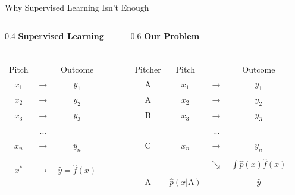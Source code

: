 \documentclass{beamer}
\begin{document}
  \begin{frame}{Why Supervised Learning Isn't Enough}
    \begin{columns}
      \begin{column}{0.4\columnwidth}
        \centering
        {\bf Supervised Learning}\\
        ~\\
        \begin{tabular}{ccc}
          Pitch &               & Outcome\\
          $x_1$ & $\rightarrow$ & $y_1$\\
          $x_2$ & $\rightarrow$ & $y_2$\\
          $x_3$ & $\rightarrow$ & $y_3$\\
                & ...           &      \\
          $x_n$ & $\rightarrow$ & $y_n$\\
          \\
          \\
          \\
          $x^*$ & $\rightarrow$ & $\hat y = \hat f(x)$\\
        \end{tabular}
      \end{column}
      \begin{column}{0.6\columnwidth}
        \centering
        {\bf Our Problem}\\
        ~\\
        \begin{tabular}{cccc}
          Pitcher & Pitch &               & Outcome\\
          A       & $x_1$ & $\rightarrow$ & $y_1$\\
          A       & $x_2$ & $\rightarrow$ & $y_2$\\
          B       & $x_3$ & $\rightarrow$ & $y_3$\\
                  &       & ...           &      \\
          C       & $x_n$ & $\rightarrow$ & $y_n$\\
                  & \\
                  &       & $\searrow$    & {\color{solarizedRebase03} $\int\hat p(x)\hat f(x)$}\\
                  & \\
          A       &  {\color{solarizedRebase03} $\hat p(x|\text{A})$}     &               & $\hat y$\\
        \end{tabular}
      \end{column}
    \end{columns}
  \end{frame}
\end{document}
